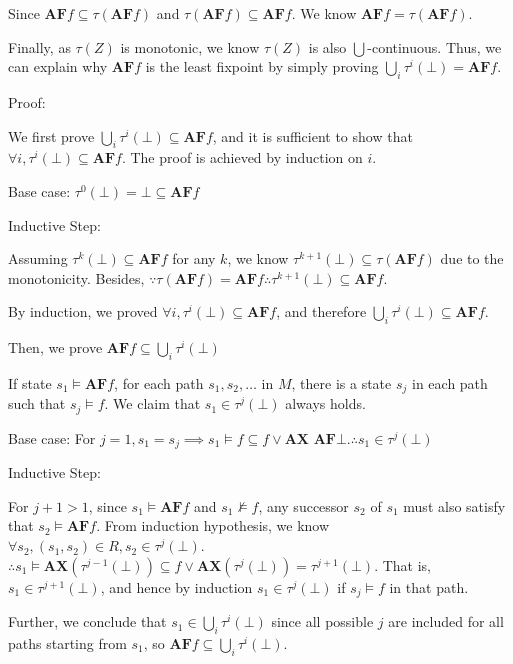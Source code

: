\documentclass[a4paper,11pt]{article}
\theoremstyle{mytheor}
\begin{document}
Since $\textbf{AF}f \subseteq \tau(\textbf{AF}f)$ and $\tau(\textbf{AF}f) 
\subseteq \textbf{AF}f$. We know $\textbf{AF}f = \tau(\textbf{AF}f)$.

\bigskip
\noindent
Finally, as $\tau(Z)$ is monotonic, we know $\tau(Z)$ is also 
$\bigcup$-continuous. Thus, we can explain why $\textbf{AF}f$ is the least
fixpoint by simply proving $\bigcup_{i}\tau^{i}(\bot) = \textbf{AF}f$.

\noindent Proof:

We first prove $\bigcup_{i}\tau^{i}(\bot) \subseteq \textbf{AF}f$, and it is
sufficient to show that $\forall i, \tau^{i}(\bot) \subseteq \textbf{AF}f$.
The proof is achieved by induction on $i$.

\noindent Base case: $\tau^{0}(\bot) = \bot \subseteq \textbf{AF}f$

\noindent Inductive Step:

Assuming $\tau^{k}(\bot) \subseteq \textbf{AF}f$ for any $k$, we know 
$\tau^{k+1}(\bot) \subseteq \tau(\textbf{AF}f)$ due to the monotonicity.
Besides, $\because \tau(\textbf{AF}f) = \textbf{AF}f \therefore 
\tau^{k+1}(\bot) \subseteq \textbf{AF}f$.

\noindent By induction, we proved $\forall i, \tau^{i}(\bot) \subseteq \textbf{AF}f$,
and therefore $\bigcup_{i}\tau^{i}(\bot) \subseteq \textbf{AF}f$.

\medskip
\noindent Then, we prove $\textbf{AF}f \subseteq \bigcup_{i}\tau^{i}(\bot)$

If state $s_1 \models \textbf{AF}f$, for each path $s_1, s_2, \dots$ in $M$, 
there is a state $s_j$ in each path such that $s_j \models f$. We claim that
$s_1 \in \tau^{j}(\bot)$ always holds.

\noindent Base case: For $j=1, s_1=s_j \implies s_1 \models f \subseteq f \vee
\textbf{AX\ AF} \bot. \therefore s_1 \in \tau^{j}(\bot)$

\noindent Inductive Step:

For $j+1>1$, since $s_1 \models \textbf{AF}f$ and $s_1 \not\models f$, any
successor $s_2$ of $s_1$ must also satisfy that $s_2 \models \textbf{AF}f$.
From induction hypothesis, we know $\forall s_2, (s_1, s_2) \in R, 
s_2 \in \tau^{j}(\bot)$. \\
$\therefore s_1 \models \textbf{AX}(\tau^{j-1}(\bot)) \subseteq 
f \vee \textbf{AX}(\tau^{j}(\bot)) = \tau^{j+1}(\bot)$. That is, 
$s_1 \in \tau^{j+1}(\bot)$, and hence by induction $s_1 \in \tau^{j}(\bot)$ 
if $s_j \models f$ in that path.

Further, we conclude that $s_1 \in \bigcup_{i}\tau^{i}(\bot)$ since all possible
$j$ are included for all paths starting from $s_1$, so $\textbf{AF}f \subseteq
\bigcup_{i}\tau^{i}(\bot)$.
\end{document}
